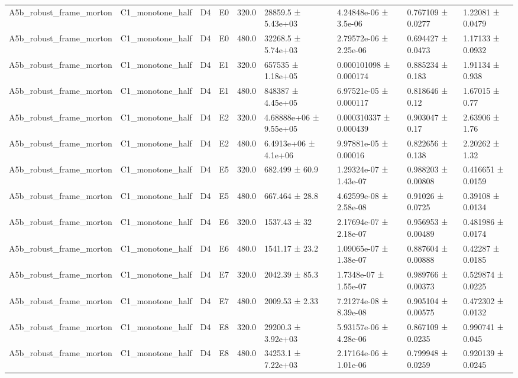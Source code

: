 \begin{table}
\begin{tabular}{lllllllll}
A5b\_robust\_frame\_morton & C1\_monotone\_half & D4 & E0 & 320.0 & 28859.5 ± 5.43e+03 & 4.24848e-06 ± 3.5e-06 & 0.767109 ± 0.0277 & 1.22081 ± 0.0479 \\
A5b\_robust\_frame\_morton & C1\_monotone\_half & D4 & E0 & 480.0 & 32268.5 ± 5.74e+03 & 2.79572e-06 ± 2.25e-06 & 0.694427 ± 0.0473 & 1.17133 ± 0.0932 \\
A5b\_robust\_frame\_morton & C1\_monotone\_half & D4 & E1 & 320.0 & 657535 ± 1.18e+05 & 0.000101098 ± 0.000174 & 0.885234 ± 0.183 & 1.91134 ± 0.938 \\
A5b\_robust\_frame\_morton & C1\_monotone\_half & D4 & E1 & 480.0 & 848387 ± 4.45e+05 & 6.97521e-05 ± 0.000117 & 0.818646 ± 0.12 & 1.67015 ± 0.77 \\
A5b\_robust\_frame\_morton & C1\_monotone\_half & D4 & E2 & 320.0 & 4.68888e+06 ± 9.55e+05 & 0.000310337 ± 0.000439 & 0.903047 ± 0.17 & 2.63906 ± 1.76 \\
A5b\_robust\_frame\_morton & C1\_monotone\_half & D4 & E2 & 480.0 & 6.4913e+06 ± 4.1e+06 & 9.97881e-05 ± 0.00016 & 0.822656 ± 0.138 & 2.20262 ± 1.32 \\
A5b\_robust\_frame\_morton & C1\_monotone\_half & D4 & E5 & 320.0 & 682.499 ± 60.9 & 1.29324e-07 ± 1.43e-07 & 0.988203 ± 0.00808 & 0.416651 ± 0.0159 \\
A5b\_robust\_frame\_morton & C1\_monotone\_half & D4 & E5 & 480.0 & 667.464 ± 28.8 & 4.62599e-08 ± 2.58e-08 & 0.91026 ± 0.0725 & 0.39108 ± 0.0134 \\
A5b\_robust\_frame\_morton & C1\_monotone\_half & D4 & E6 & 320.0 & 1537.43 ± 32 & 2.17694e-07 ± 2.18e-07 & 0.956953 ± 0.00489 & 0.481986 ± 0.0174 \\
A5b\_robust\_frame\_morton & C1\_monotone\_half & D4 & E6 & 480.0 & 1541.17 ± 23.2 & 1.09065e-07 ± 1.38e-07 & 0.887604 ± 0.00888 & 0.42287 ± 0.0185 \\
A5b\_robust\_frame\_morton & C1\_monotone\_half & D4 & E7 & 320.0 & 2042.39 ± 85.3 & 1.7348e-07 ± 1.55e-07 & 0.989766 ± 0.00373 & 0.529874 ± 0.0225 \\
A5b\_robust\_frame\_morton & C1\_monotone\_half & D4 & E7 & 480.0 & 2009.53 ± 2.33 & 7.21274e-08 ± 8.39e-08 & 0.905104 ± 0.00575 & 0.472302 ± 0.0132 \\
A5b\_robust\_frame\_morton & C1\_monotone\_half & D4 & E8 & 320.0 & 29200.3 ± 3.92e+03 & 5.93157e-06 ± 4.28e-06 & 0.867109 ± 0.0235 & 0.990741 ± 0.045 \\
A5b\_robust\_frame\_morton & C1\_monotone\_half & D4 & E8 & 480.0 & 34253.1 ± 7.22e+03 & 2.17164e-06 ± 1.01e-06 & 0.799948 ± 0.0259 & 0.920139 ± 0.0245 \\

\end{tabular}
\end{table}
